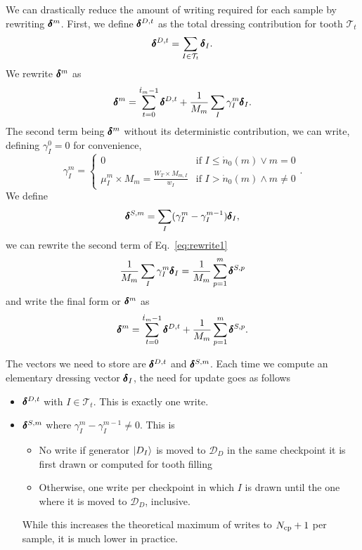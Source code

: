 \documentclass[./thesis.tex]{subfiles}
\begin{document}
We can drastically reduce the amount of writing required for each sample by rewriting $\pmb \delta^m$.
First, we define $\pmb \delta^{D,t}$ as the total dressing contribution for tooth $\mathcal{T}_t$
\begin{equation}
\pmb \delta^{D,t} = \sum_{I \in \mathcal{T}_t} \pmb \delta_I.
\end{equation}
We rewrite $\pmb \delta^m$ as
\begin{equation}
\label{eq:rewrite1}
\pmb \delta^{m} = \sum_{t=0}^{\dot t_m - 1} \pmb \delta^{D,t}+ \frac{1}{M_m} \sum_{I} \gamma^m_{I} \pmb \delta_I.
\end{equation}
The second term being $\pmb \delta^m$ without its deterministic contribution, we can write, defining $\gamma^ 0_I=0$ for convenience,
\begin{equation}
\gamma^m_I = 
\begin{cases}
0 & \text{if } I \leq \dot n_0(m) \vee m=0 \\
\mu^m_I \times M_m = \frac{W_T \times M_{m,I}}{w_I} & \text{if } I > \dot n_0(m) \wedge m \neq 0
\end{cases}.
\end{equation}
We define
\begin{align}
\pmb \delta^{S,m} = \sum_I (\gamma^m_I - \gamma^{m-1}_I) \pmb \delta_I,
\end{align}
we can rewrite the second term of Eq.~\eqref{eq:rewrite1}
\begin{equation}
\frac{1}{M_m}\sum_{I} \gamma^m_{I} \pmb \delta_I = \frac{1}{M_m} \sum_{p=1}^m \pmb \delta^{S,p}
\end{equation}
and write the final form or $\pmb \delta^m$ as
\begin{equation}
\pmb \delta^m=\sum_{t=0}^{\dot t_{m}-1} \pmb \delta^{D,t} + \frac{1}{M_m} \sum_{p=1}^m \pmb \delta^{S,p}.
\end{equation}

The vectors we need to store are $\pmb \delta^{D,t}$ and $\pmb \delta^{S,m}$. Each time we compute an elementary dressing vector $\pmb \delta_I$, the need for update goes as follows
\begin{itemize}
\item
$\pmb \delta^{D,t}$ with $I \in \mathcal{T}_t$. This is exactly one write.
\item
$\pmb \delta^{S,m}$ where $\gamma^m_I - \gamma^{m-1}_I \neq 0$. This is
 \begin{itemize}
 \item No write if generator $\ket{D_I}$ is moved to $\mathcal{D}_D$ in the same checkpoint it is first drawn or computed for tooth filling
 \item Otherwise, one write per checkpoint in which $I$ is drawn until the one where it is moved to $\mathcal{D}_D$, inclusive.
 \end{itemize}
 While this increases the theoretical maximum of writes to ${N_\text{cp}}+1$ per sample, it is much lower in practice.
\end{itemize}
\end{document}
